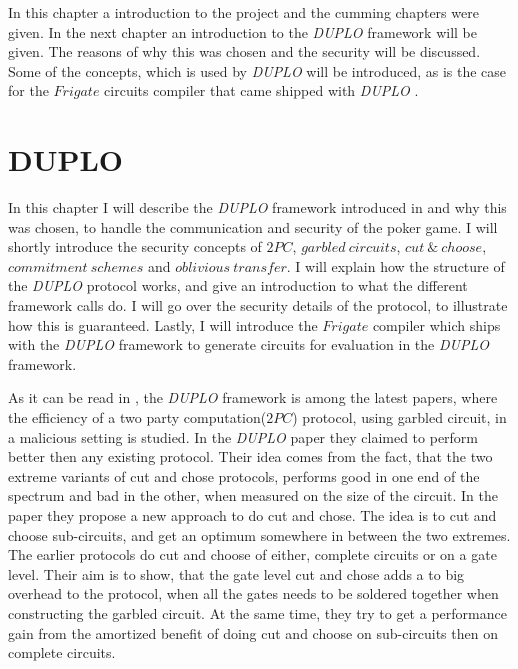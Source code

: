 \documentclass[twoside,11pt,openright]{report}
\newcommand{\DUPLO}{\textit{DUPLO} }
\begin{document}
\bigskip

In this chapter a introduction to the project and the cumming chapters were given. In the next chapter an introduction to the \DUPLO framework will be given. The reasons of why this was chosen and the security will be discussed. Some of the concepts, which is used by \DUPLO will be introduced, as is the case for the $Frigate$ circuits compiler that came shipped with \DUPLO.


\chapter{DUPLO}
\label{ch:duplo}

In this chapter I will describe the \DUPLO framework introduced in \cite{duplo} and why this was chosen, to handle the communication and security of the poker game. I will shortly introduce the security concepts of $2PC$, $garbled~circuits$, $cut~\&~choose$, $commitment~schemes$ and $oblivious~transfer$. I will explain how the structure of the \DUPLO protocol works, and give an introduction to what the different framework calls do. I will go over the security details of the protocol, to illustrate how this is guaranteed. Lastly, I will introduce the $Frigate$ compiler which ships with the \DUPLO framework to generate circuits for evaluation in the \DUPLO framework.

\bigskip

As it can be read in \cite{duplo}, the \DUPLO framework is among the latest papers, where the efficiency of a two party computation($2PC$) protocol, using garbled circuit, in a malicious setting is studied. In the \DUPLO paper they claimed to perform better then any existing protocol. Their idea comes from the fact, that the two extreme variants of cut and chose protocols, performs good in one end of the spectrum and bad in the other, when measured on the size of the circuit. In the paper they propose a new approach to do cut and chose. The idea is to cut and choose sub-circuits, and get an optimum somewhere in between the two extremes. The earlier protocols do cut and choose of either, complete circuits or on a gate level. Their aim is to show, that the gate level cut and chose adds a to big overhead to the protocol, when all the gates needs to be soldered together when constructing the garbled circuit. At the same time, they try to get a performance gain from the amortized benefit of doing cut and choose on sub-circuits then on complete circuits.
\end{document}
